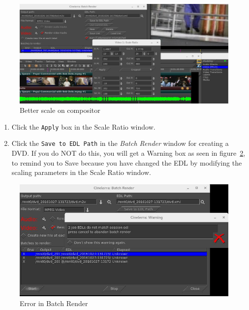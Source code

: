 \begin{figure}[htpb]
    \centering
    \includegraphics[width=0.9\linewidth]{images/dvd04.png}
    \caption{Better scale on compositor}
    \label{fig:dvd04}
\end{figure}

\begin{enumerate}[start=12]
    \item Click the \texttt{Apply} box in the Scale Ratio window.
    \item Click the \texttt{Save to EDL Path} in the \textit{Batch Render} window for creating a DVD.  If you do NOT do this, you will get a Warning box as seen in figure~\ref{fig:dvd-batch05}, to remind you to Save because you have changed the EDL by modifying the scaling parameters in the Scale Ratio window.
\end{enumerate}

\begin{figure}[htpb]
    \centering
    \includegraphics[width=0.8\linewidth]{images/dvd-batch05.png}
    \caption{Error in Batch Render}
    \label{fig:dvd-batch05}
\end{figure}

